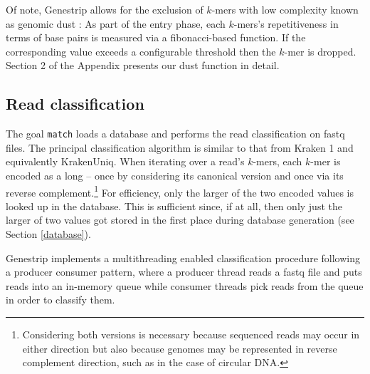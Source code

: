 \documentclass[pdflatex,sn-vancouver-num]{sn-jnl}
\begin{document}
    Of note, Genestrip allows for the exclusion of $k$-mers with low complexity known as genomic dust \citep{doi:10.1089/cmb.2006.13.1028}: As part of the entry phase, each $k$-mers's repetitiveness in terms of base pairs is measured via a fibonacci-based function. If the corresponding value exceeds a configurable threshold then the $k$-mer is dropped. Section 2
    of the Appendix presents our dust function in detail.

    \subsection{Read classification}
\label{readclassification}

    The goal \verb|match| loads a database and performs the read classification on fastq files.
    The principal classification algorithm is similar to that from  Kraken 1 \citep{kraken} and equivalently KrakenUniq. When iterating over a read's $k$-mers, each $k$-mer is encoded as a long -- once by considering its canonical version and once via its reverse complement.\footnote{Considering both versions is necessary because sequenced reads may occur in either direction but also because genomes may be represented in reverse complement direction, such as in the case of circular DNA.} For efficiency, only the larger of the two encoded values is looked up in the database. This is sufficient since, if at all, then only just the larger of two values got stored in the first place during database generation (see Section \ref{database}).

    Genestrip implements a multithreading enabled classification procedure following a producer consumer pattern, where a producer thread reads a fastq file and puts reads into an in-memory queue while consumer threads pick reads from the queue in order to classify them.
\end{document}
